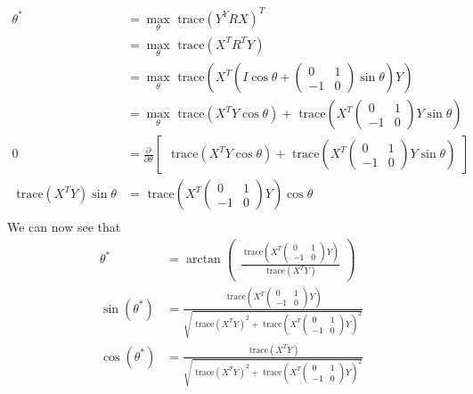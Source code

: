 \begin{align*}
\theta^* &= \underset{\theta}{\operatorname{max}} \text{ trace}(Y^YRX)^T\\
&= \underset{\theta}{\operatorname{max}} \text{ trace}(X^T R^TY)\\
&= \underset{\theta}{\operatorname{max}} \text{ trace}(X^T(I\cos\theta + 
\begin{pmatrix}
0 & 1 \\ -1 & 0
\end{pmatrix}
\sin\theta)Y)\\
&= \underset{\theta}{\operatorname{max}} \text{ trace}(X^T Y\cos\theta) + \text{ trace}(X^T 
\begin{pmatrix}
0 & 1 \\ -1 & 0
\end{pmatrix}
Y\sin\theta)\\
0 &= \frac{\partial}{\partial\theta}
\begin{bmatrix}
\text{ trace}(X^T Y\cos\theta) + \text{ trace}(X^T 
\begin{pmatrix}
0 & 1 \\ -1 & 0
\end{pmatrix}
Y\sin\theta)
\end{bmatrix}\\
\text{ trace}(X^T Y)\sin\theta &= \text{ trace}(X^T 
\begin{pmatrix}
0 & 1 \\ -1 & 0
\end{pmatrix}
Y)\cos\theta \\
\end{align*}
We can now see that
\begin{align*}
\theta^* &= \arctan
\begin{pmatrix}
\frac{\text{ trace}(X^T
\begin{pmatrix}
0 & 1 \\ -1 & 0
\end{pmatrix}
Y)}{\text{ trace}(X^TY)}
\end{pmatrix} \\
\sin(\theta^*) &= \frac{\text{ trace}(X^T
\begin{pmatrix}
0 & 1 \\ -1 & 0
\end{pmatrix}
Y)}{\sqrt{\text{ trace}(X^TY)^2 + \text{ trace}(X^T
\begin{pmatrix}
0 & 1 \\ -1 & 0
\end{pmatrix}
Y)^2}} \\
\cos(\theta^*) &= \frac{\text{ trace}(X^TY)}{\sqrt{\text{ trace}(X^TY)^2 + \text{ trace}(X^T
\begin{pmatrix}
0 & 1 \\ -1 & 0
\end{pmatrix}
Y)^2}} \\
\end{align*}
